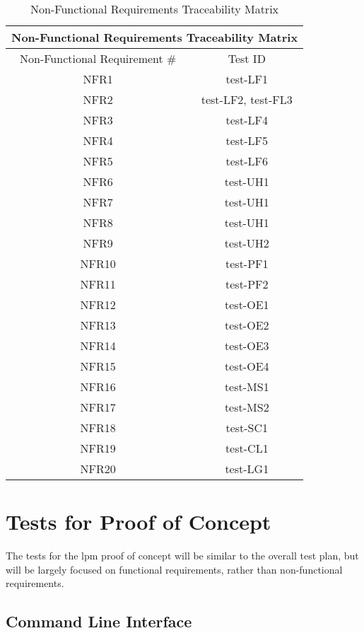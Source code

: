 \documentclass[12pt, titlepage]{article}
\begin{document}
\begin{table}[H]
    \centering
    \begin{tabular}{|c|c|}
\hline
\multicolumn{2}{|c|}{Non-Functional Requirements Traceability Matrix} \\ \hline
Non-Functional Requirement \# & Test ID \\ \hline
NFR1 & test-LF1 \\ \hline
NFR2 & test-LF2, test-FL3 \\ \hline
NFR3 & test-LF4 \\ \hline
NFR4 & test-LF5 \\ \hline
NFR5 & test-LF6 \\ \hline
NFR6 & test-UH1 \\ \hline
NFR7 & test-UH1 \\ \hline
NFR8 & test-UH1 \\ \hline
NFR9 & test-UH2 \\ \hline
NFR10 & test-PF1 \\ \hline
NFR11 & test-PF2 \\ \hline
NFR12 & test-OE1 \\ \hline
NFR13 & test-OE2 \\ \hline
NFR14 & test-OE3 \\ \hline
NFR15 & test-OE4 \\ \hline
NFR16 & test-MS1 \\ \hline
NFR17 & test-MS2 \\ \hline
NFR18 & test-SC1 \\ \hline
NFR19 & test-CL1 \\ \hline
NFR20 & test-LG1 \\ \hline
\end{tabular}
    \caption{Non-Functional Requirements Traceability Matrix}
    \label{tab:nfrtrace}
\end{table}


\section{Tests for Proof of Concept}

The tests for the lpm proof of concept will be similar to the overall test plan, but will be largely focused on functional requirements, rather than non-functional requirements.

\subsection{Command Line Interface}
\end{document}
